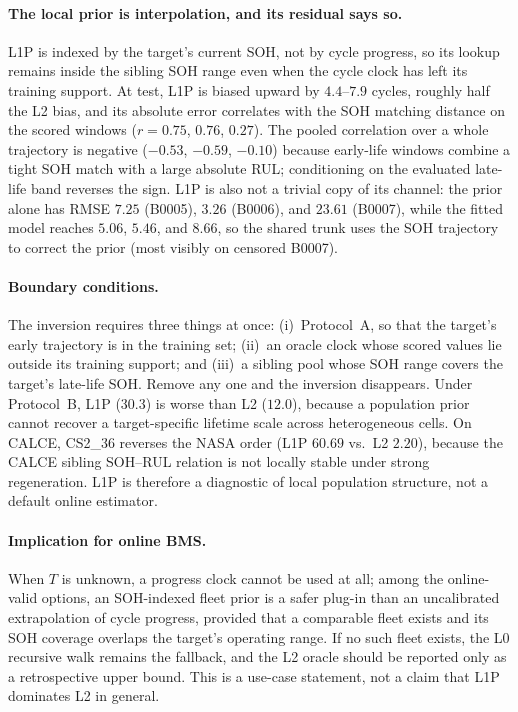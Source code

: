 \documentclass[preprint,12pt]{elsarticle}
\begin{document}
\paragraph{The local prior is interpolation, and its residual says so.}
L1P is indexed by the target's current SOH, not by cycle progress, so its lookup remains inside the sibling SOH range even when the cycle clock has left its training support.
At test, L1P is biased upward by $4.4$--$7.9$ cycles, roughly half the L2 bias, and its absolute error correlates with the SOH matching distance on the scored windows ($r=0.75$, $0.76$, $0.27$).
The pooled correlation over a whole trajectory is negative ($-0.53$, $-0.59$, $-0.10$) because early-life windows combine a tight SOH match with a large absolute RUL; conditioning on the evaluated late-life band reverses the sign.
L1P is also not a trivial copy of its channel: the prior alone has RMSE $7.25$ (B0005), $3.26$ (B0006), and $23.61$ (B0007), while the fitted model reaches $5.06$, $5.46$, and $8.66$, so the shared trunk uses the SOH trajectory to correct the prior (most visibly on censored B0007).

\paragraph{Boundary conditions.}
The inversion requires three things at once: (i)~Protocol~A, so that the target's early trajectory is in the training set; (ii)~an oracle clock whose scored values lie outside its training support; and (iii)~a sibling pool whose SOH range covers the target's late-life SOH.
Remove any one and the inversion disappears.
Under Protocol~B, L1P ($30.3$) is worse than L2 ($12.0$), because a population prior cannot recover a target-specific lifetime scale across heterogeneous cells.
On CALCE, CS2\_36 reverses the NASA order (L1P $60.69$ vs.\ L2 $2.20$), because the CALCE sibling SOH--RUL relation is not locally stable under strong regeneration.
L1P is therefore a diagnostic of local population structure, not a default online estimator.

\paragraph{Implication for online BMS.}
When $T$ is unknown, a progress clock cannot be used at all; among the online-valid options, an SOH-indexed fleet prior is a safer plug-in than an uncalibrated extrapolation of cycle progress, provided that a comparable fleet exists and its SOH coverage overlaps the target's operating range.
If no such fleet exists, the L0 recursive walk remains the fallback, and the L2 oracle should be reported only as a retrospective upper bound.
This is a use-case statement, not a claim that L1P dominates L2 in general.
\end{document}
